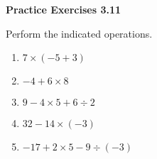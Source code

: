 \vspace{0.3ex}
\noindent\textbf{Practice Exercises 3.11}

\vspace{0.2ex}

Perform the indicated operations.
\begin{multicols}{2}
\begin{enumerate}[noitemsep, label = \color{blue}\arabic*. ]
\item \(7 \times (-5 + 3)\)
\item \(-4 + 6 \times 8\)
\item \(9 - 4 \times 5 + 6 \div 2\)
\item \(32 - 14 \times (-3)\)
\item \(-17 + 2 \times 5 - 9 \div (-3)\)
\end{enumerate}
\end{multicols}
